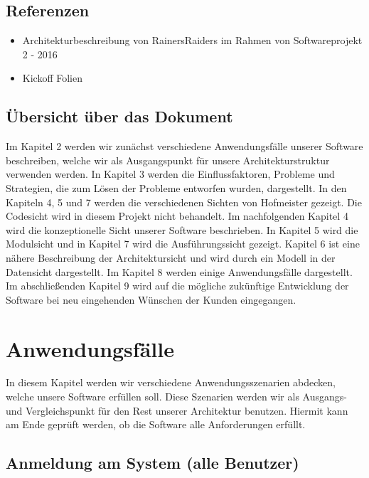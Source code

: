 \documentclass[enabledeprecatedfontcommands,fontsize=12pt,paper=a4,twoside]{scrartcl}
\begin{document}
\subsection{Referenzen}
\begin{itemize}
  \item Architekturbeschreibung von RainersRaiders im Rahmen von Softwareprojekt 2 - 2016
  \item Kickoff Folien
\end{itemize}
\subsection{Übersicht über das Dokument}

{  Im Kapitel 2 werden wir zunächst verschiedene Anwendungsfälle unserer Software beschreiben, welche wir als Ausgangspunkt für unsere Architekturstruktur verwenden werden. In Kapitel 3 werden die Einflussfaktoren, Probleme und Strategien, die zum Lösen der Probleme entworfen wurden, dargestellt.
In den Kapiteln 4, 5 und 7 werden die verschiedenen Sichten von Hofmeister gezeigt. Die Codesicht wird in diesem Projekt nicht behandelt.
Im nachfolgenden Kapitel 4 wird die konzeptionelle Sicht unserer Software beschrieben. In Kapitel 5 wird die Modulsicht und in Kapitel 7 wird die Ausführungssicht gezeigt. Kapitel 6 ist eine nähere Beschreibung der Architektursicht und wird durch ein Modell in der Datensicht dargestellt.
Im Kapitel 8 werden einige Anwendungsfälle dargestellt. Im abschließenden Kapitel 9 wird auf die mögliche zukünftige Entwicklung der Software bei neu eingehenden Wünschen der Kunden eingegangen.

}



\section{Anwendungsfälle}

In diesem Kapitel werden wir verschiedene Anwendungsszenarien abdecken, welche unsere Software erfüllen soll. Diese Szenarien werden wir als Ausgangs- und Vergleichspunkt für den Rest unserer Architektur benutzen. Hiermit kann am Ende geprüft werden, ob die Software alle Anforderungen erfüllt. 

\subsection{Anmeldung am System (alle Benutzer)}
\end{document}
